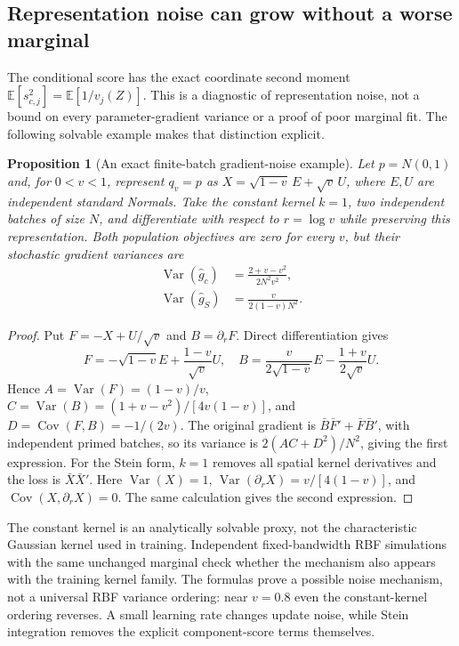 \documentclass[11pt,a4paper]{article}
\newtheorem{proposition}{Proposition}[section]
\newcommand{\E}{\mathbb E}
\newcommand{\Var}{\operatorname{Var}}
\newcommand{\Cov}{\operatorname{Cov}}
\begin{document}
\subsection{Representation noise can grow without a worse marginal}
The conditional score has the exact coordinate second moment
$\E[s_{c,j}^2]=\E[1/v_j(Z)]$. This is a diagnostic of representation noise,
not a bound on every parameter-gradient variance or a proof of poor marginal
fit. The following solvable example makes that distinction explicit.

\begin{proposition}[An exact finite-batch gradient-noise example]
Let $p=N(0,1)$ and, for $0<v<1$, represent $q_v=p$ as
$X=\sqrt{1-v}\,E+\sqrt v\,U$, where $E,U$ are independent standard Normals.
Take the constant kernel $k=1$, two independent batches of size $N$, and
differentiate with respect to $r=\log v$ while preserving this representation.
Both population objectives are zero for every $v$, but their stochastic
gradient variances are
\begin{align}
 \Var(\widehat g_c)&=\frac{2+v-v^2}{2N^2v^2},\\
 \Var(\widehat g_S)&=\frac{v}{2(1-v)N^2}.
 \label{eq:proxy}
\end{align}
\end{proposition}
\begin{proof}
Put $F=-X+U/\sqrt v$ and $B=\partial_rF$. Direct differentiation gives
\[
 F=-\sqrt{1-v}E+\frac{1-v}{\sqrt v}U,\quad
 B=\frac{v}{2\sqrt{1-v}}E-\frac{1+v}{2\sqrt v}U.
\]
Hence $A=\Var(F)=(1-v)/v$,
$C=\Var(B)=(1+v-v^2)/[4v(1-v)]$, and
$D=\Cov(F,B)=-1/(2v)$. The original gradient is
$\bar B\bar F'+\bar F\bar B'$, with independent primed batches, so its
variance is $2(AC+D^2)/N^2$, giving the first expression.
For the Stein form, $k=1$ removes all spatial kernel derivatives and the loss
is $\bar X\bar X'$. Here $\Var(X)=1$,
$\Var(\partial_rX)=v/[4(1-v)]$, and
$\Cov(X,\partial_rX)=0$. The same calculation gives the second expression.
\end{proof}

The constant kernel is an analytically solvable proxy, not the characteristic
Gaussian kernel used in training. Independent fixed-bandwidth RBF simulations
with the same unchanged marginal check whether the mechanism also appears
with the training kernel family. The formulas prove a possible noise mechanism,
not a universal RBF variance ordering: near $v=0.8$ even the constant-kernel
ordering reverses. A small learning rate changes update noise, while Stein
integration removes the explicit component-score terms themselves.
\end{document}
